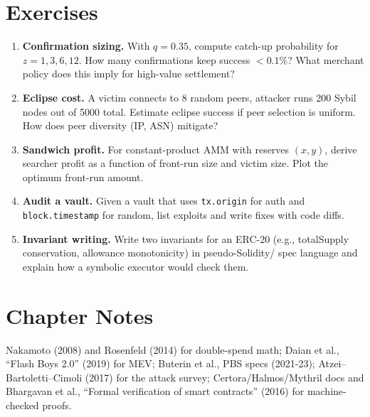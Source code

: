 \section{Exercises}\label{sec:ch07-exercises}
\begin{enumerate}[label=E7.\arabic*, leftmargin=*, itemsep=0.6em]
    \item \textbf{Confirmation sizing.} With $q=0.35$, compute catch-up probability for $z=1,3,6,12$. How many confirmations keep success $<0.1\%$? What merchant policy does this imply for high-value settlement?
    \item \textbf{Eclipse cost.} A victim connects to 8 random peers, attacker runs 200 Sybil nodes out of 5000 total. Estimate eclipse success if peer selection is uniform. How does peer diversity (IP, ASN) mitigate?
    \item \textbf{Sandwich profit.} For constant-product AMM with reserves $(x,y)$, derive searcher profit as a function of front-run size and victim size. Plot the optimum front-run amount.
    \item \textbf{Audit a vault.} Given a vault that uses \texttt{tx.origin} for auth and \texttt{block.timestamp} for random, list exploits and write fixes with code diffs.
    \item \textbf{Invariant writing.} Write two invariants for an ERC-20 (e.g., totalSupply conservation, allowance monotonicity) in pseudo-Solidity/ spec language and explain how a symbolic executor would check them.
\end{enumerate}

\section*{Chapter Notes}
Nakamoto (2008) and Rosenfeld (2014) for double-spend math; Daian et al., ``Flash Boys 2.0'' (2019) for MEV; Buterin et al., PBS specs (2021-23); Atzei--Bartoletti--Cimoli (2017) for the attack survey; Certora/Halmos/Mythril docs and Bhargavan et al., ``Formal verification of smart contracts'' (2016) for machine-checked proofs.
